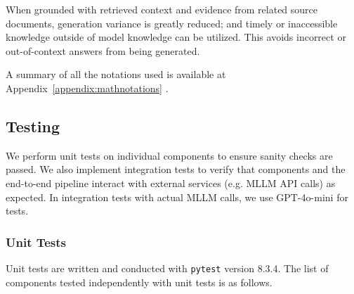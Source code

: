 When grounded with retrieved context and evidence from related source documents, generation variance is greatly reduced;
and timely or inaccessible knowledge outside of model knowledge can be utilized.
This avoids incorrect or out-of-context answers from being generated.

A summary of all the notations used is available at Appendix~\ref{appendix:mathnotations} .


\subsection{Testing}
\label{sec:testing}

We perform unit tests on individual components to ensure sanity checks are passed.
We also implement integration tests to verify that components and the end-to-end pipeline interact with external services (e.g. MLLM API calls) as expected.
In integration tests with actual MLLM calls, we use GPT-4o-mini for tests.

\subsubsection{Unit Tests}

Unit tests are written and conducted with \verb|pytest| version 8.3.4.
The list of components tested independently with unit tests is as follows.

